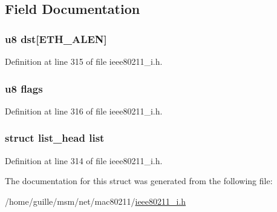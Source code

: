 \subsection{Field Documentation}
\hypertarget{structmesh__preq__queue_a7e206c9dbce55c0147656b4e271c71e4}{
\subsubsection[{dst}]{\setlength{\rightskip}{0pt plus 5cm}u8 dst\mbox{[}E\-T\-H\-\_\-\-A\-L\-E\-N\mbox{]}}}\label{structmesh__preq__queue_a7e206c9dbce55c0147656b4e271c71e4}


Definition at line 315 of file ieee80211\-\_\-i.\-h.

\hypertarget{structmesh__preq__queue_aa246fa433d167a7f6f8533227e40b76e}{
\subsubsection[{flags}]{\setlength{\rightskip}{0pt plus 5cm}u8 flags}}\label{structmesh__preq__queue_aa246fa433d167a7f6f8533227e40b76e}


Definition at line 316 of file ieee80211\-\_\-i.\-h.

\hypertarget{structmesh__preq__queue_a1f00f18b91d5a820f2c43064243aa86e}{
\subsubsection[{list}]{\setlength{\rightskip}{0pt plus 5cm}struct list\-\_\-head list}}\label{structmesh__preq__queue_a1f00f18b91d5a820f2c43064243aa86e}


Definition at line 314 of file ieee80211\-\_\-i.\-h.



The documentation for this struct was generated from the following file\-:\begin{DoxyCompactItemize}
\item 
/home/guille/msm/net/mac80211/\hyperlink{ieee80211__i_8h}{ieee80211\-\_\-i.\-h}\end{DoxyCompactItemize}
